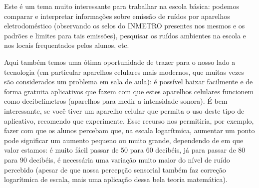 \documentclass[12pt, a4paper]{article}
\begin{document}
Este é um tema muito interessante para trabalhar na escola básica: podemos comparar e interpretar informações sobre emissão de ruídos por aparelhos eletrodoméstico (observando os selos do INMETRO presentes nos mesmos e os padrões e limites para tais emissões), pesquisar os ruídos ambientes na escola e nos locais frequentados pelos alunos, etc.

Aqui também temos uma ótima oportunidade de trazer para o nosso lado a tecnologia (em particular aparelhos celulares mais modernos, que muitas vezes são considerados um problema em sala de aula): é possível baixar facilmente e de forma gratuita aplicativos que fazem com que estes aparelhos celulares funcionem como decibelímetros (aparelhos para medir a intensidade sonora). É bem interessante, se você tiver um aparelho celular que permita o uso deste tipo de aplicativo, recomendo que experimente. Esse recurso nos permitiria, por exemplo, fazer com que os alunos percebam que, na escala logarítmica, aumentar um ponto pode significar um aumento pequeno ou muito grande, dependendo de em que valor estamos: é muito fácil passar de 50 para 60 decibéis, já para passar de 80 para 90 decibéis, é necessária uma variação muito maior do nível de ruído percebido (apesar de que nossa percepção sensorial também faz correção logarítmica de escala, mais uma aplicação dessa bela teoria matemática).
\end{document}
